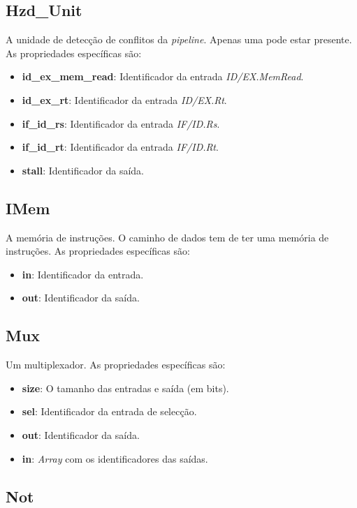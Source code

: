 \documentclass[11pt,a4paper,twoside,titlepage]{report}
\begin{document}
\subsection{Hzd\_Unit}
A unidade de detecção de conflitos da \emph{pipeline}. Apenas uma pode estar
presente.
As propriedades específicas são:
\begin{itemize}
	\item \textbf{id\_ex\_mem\_read}: Identificador da entrada \emph{ID/EX.MemRead}.
	\item \textbf{id\_ex\_rt}: Identificador da entrada \emph{ID/EX.Rt}.
	\item \textbf{if\_id\_rs}: Identificador da entrada \emph{IF/ID.Rs}.
	\item \textbf{if\_id\_rt}: Identificador da entrada \emph{IF/ID.Rt}.
	\item \textbf{stall}: Identificador da saída.
\end{itemize}

\subsection{IMem}

A memória de instruções. O caminho de dados tem de ter uma memória de instruções.
As propriedades específicas são:
\begin{itemize}
	\item \textbf{in}: Identificador da entrada.
	\item \textbf{out}: Identificador da saída.
\end{itemize}

\subsection{Mux}

Um multiplexador. As propriedades específicas são:
\begin{itemize}
	\item \textbf{size}: O tamanho das entradas e saída (em bits).
	\item \textbf{sel}: Identificador da entrada de selecção.
	\item \textbf{out}: Identificador da saída.
	\item \textbf{in}: \emph{Array} com os identificadores das saídas.
\end{itemize}

\subsection{Not}
\end{document}
